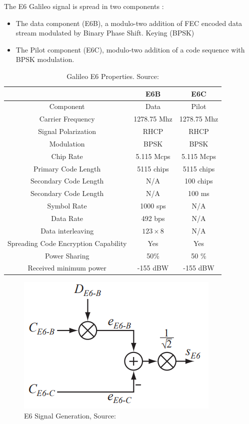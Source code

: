 The E6 Galileo signal is spread in two components \cite{e6breceiver}:
\begin{itemize}
    \item The data component (E6B), a modulo-two addition of FEC encoded data stream modulated by Binary Phase Shift. Keying (BPSK)
    \item The Pilot component (E6C), modulo-two addition of a code sequence with BPSK modulation.
\end{itemize}

\begin{table}[h!]
\centering
\begin{tabular}{| c | c | c |}
    \hline
    & E6B & E6C \\
    \hline
    Component & Data & Pilot \\
    \hline
    Carrier Frequency & 1278.75 Mhz & 1278.75 Mhz \\
    \hline
    Signal Polarization & RHCP & RHCP \\
    \hline
    Modulation & BPSK & BPSK \\
    \hline
    Chip Rate & 5.115 Mcps & 5.115 Mcps\\
    \hline
    Primary Code Length & 5115 chips & 5115 chips \\
    \hline
    Secondary Code Length & N/A & 100 chips \\
    \hline
    Secondary Code Length & N/A & 100 ms \\
    \hline
    Symbol Rate & 1000 sps & N/A \\
    \hline
    Data Rate & 492 bps & N/A\\
    \hline
    Data interleaving & $123 \times 8$ & N/A\\
    \hline
    Spreading Code Encryption Capability & Yes & Yes \\
    \hline
    Power Sharing & 50\% & 50 \% \\
    \hline
    Received minimum power & -155 dBW & -155 dBW \\
    \hline
\end{tabular}
\caption{Galileo E6 Properties. Source: \cite{e6breceiver}}
\label{table:2}
\end{table}

\begin{figure}[h]
\centering
\includegraphics[scale=0.7]{img/signalgeneration.png}
\caption{E6 Signal Generation, Source:\cite{e6breceiver}}
\label{fig:signalgeneration}
\end{figure}

